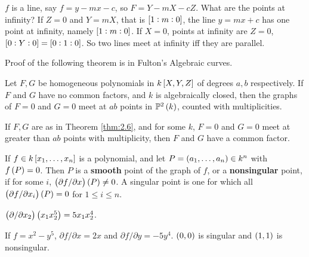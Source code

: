 \begin{example*}
$ f $ is a line, say $ f = y - mx - c $, so $ F = Y - mX - cZ $. What are the points at infinity? If $ Z = 0 $ and $ Y = mX $, that is $ \sbr{1 : m : 0} $, the line $ y = mx + c $ has one point at infinity, namely $ \sbr{1 : m : 0} $. If $ X = 0 $, points at infinity are $ Z = 0 $, $ \sbr{0 : Y : 0} = \sbr{0 : 1 : 0} $. So two lines meet at infinity iff they are parallel.
\end{example*}


Proof of the following theorem is in Fulton's Algebraic curves.

\begin{theorem}
\label{thm:2.6}
Let $ F, G $ be homogeneous polynomials in $ k\sbr{X, Y, Z} $ of degrees $ a, b $ respectively. If $ F $ and $ G $ have no common factors, and $ k $ is algebraically closed, then the graphs of $ F = 0 $ and $ G = 0 $ meet at $ ab $ points in $ \P^2\br{k} $, counted with multiplicities.
\end{theorem}

\begin{corollary}
If $ F, G $ are as in Theorem \ref{thm:2.6}, and for some $ k $, $ F = 0 $ and $ G = 0 $ meet at greater than $ ab $ points with multiplicity, then $ F $ and $ G $ have a common factor.
\end{corollary}

\pagebreak

\begin{definition}
If $ f \in k\sbr{x_1, \dots, x_n} $ is a polynomial, and let $ P = \br{a_1, \dots, a_n} \in k^n $ with $ f\br{P} = 0 $. Then $ P $ is a \textbf{smooth} point of the graph of $ f $, or a \textbf{nonsingular} point, if for some $ i $, $ \br{\partial f / \partial x}\br{P} \ne 0 $. A singular point is one for which all $ \br{\partial f / \partial x_i}\br{P} = 0 $ for $ 1 \le i \le n $.
\end{definition}

\begin{example*}
$ \br{\partial / \partial x_2}\br{x_1x_2^5} = 5x_1x_2^4 $.
\end{example*}

\begin{example*}
If $ f = x^2 - y^5 $, $ \partial f / \partial x = 2x $ and $ \partial f / \partial y = -5y^4 $. $ \br{0, 0} $ is singular and $ \br{1, 1} $ is nonsingular.
\end{example*}

